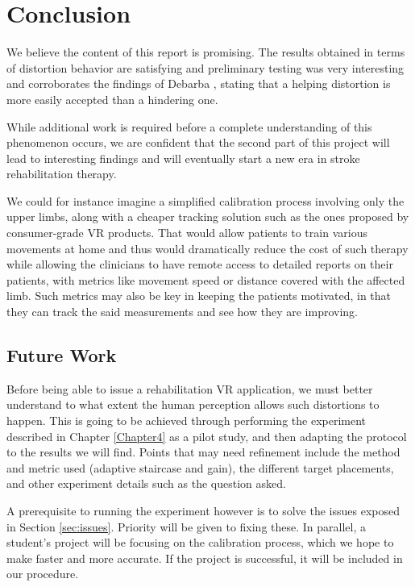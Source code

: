 
\chapter{Conclusion} %

\label{Chapter6}

We believe the content of this report is promising. The results obtained in terms of distortion behavior are satisfying and preliminary testing was very interesting and corroborates the findings of Debarba \cite{debarba2017embodiment}, stating that a helping distortion is more easily accepted than a hindering one.

While additional work is required before a complete understanding of this phenomenon occurs, we are confident that the second part of this project will lead to interesting findings and will eventually start a new era in stroke rehabilitation therapy.

We could for instance imagine a simplified calibration process involving only the upper limbs, along with a cheaper tracking solution such as the ones proposed by consumer-grade VR products. That would allow patients to train various movements at home and thus would dramatically reduce the cost of such therapy while allowing the clinicians to have remote access to detailed reports on their patients, with metrics like movement speed or distance covered with the affected limb. Such metrics may also be key in keeping the patients motivated, in that they can track the said measurements and see how they are improving.

\section{Future Work}

Before being able to issue a rehabilitation VR application, we must better understand to what extent the human perception allows such distortions to happen. This is going to be achieved through performing the experiment described in Chapter \ref{Chapter4} as a pilot study, and then adapting the protocol to the results we will find. Points that may need refinement include the method and metric used (adaptive staircase and gain), the different target placements, and other experiment details such as the question asked.

A prerequisite to running the experiment however is to solve the issues exposed in Section \ref{sec:issues}. Priority will be given to fixing these. In parallel, a student's project will be focusing on the calibration process, which we hope to make faster and more accurate. If the project is successful, it will be included in our procedure.

